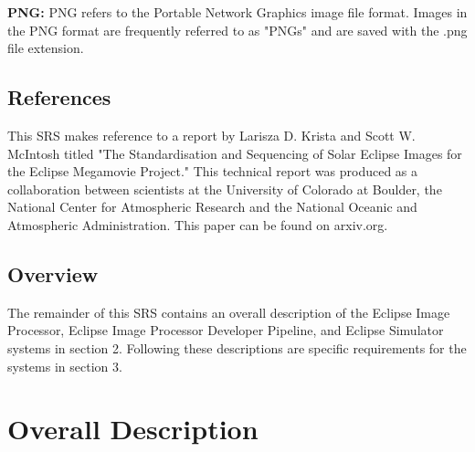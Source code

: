 \documentclass[10pt, onecolumn, draftclsnofoot, letterpaper, compsoc]{IEEEtran}
\begin{document}
	\noindent \textbf{PNG:}
	PNG refers to the Portable Network Graphics image file format.
	Images in the PNG format are frequently referred to as "PNGs" and are
	saved with the .png file extension.


\subsection{References}

This SRS makes reference to a report by Larisza D. Krista and Scott W.
McIntosh titled "The Standardisation and Sequencing of Solar Eclipse Images for
the Eclipse Megamovie Project." This technical report was produced as a
collaboration between scientists at the University of Colorado at Boulder, the
National Center for Atmospheric Research and the National Oceanic and
Atmospheric Administration. This paper can be found on arxiv.org.

\subsection{Overview}

The remainder of this SRS contains an overall description of the Eclipse Image
Processor, Eclipse Image Processor Developer Pipeline, and Eclipse Simulator
systems in section 2. Following these descriptions are specific requirements
for the systems in section 3.

\newpage
\section{Overall Description}
\end{document}
